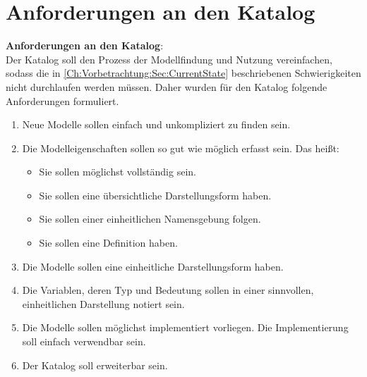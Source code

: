 \section{Anforderungen an den Katalog} %
\label{Ch:Vorbetrachtung:Sec:Anforderungen}
\textbf{Anforderungen an den Katalog}:\\ %
Der Katalog soll den Prozess der Modellfindung und Nutzung vereinfachen, sodass die in \autoref{Ch:Vorbetrachtung:Sec:CurrentState} beschriebenen Schwierigkeiten nicht durchlaufen werden müssen. Daher wurden für den Katalog folgende Anforderungen formuliert.
\begin{enumerate}[label=\textbf{Anforderung A.\arabic*}:, ref=\textbf{A.\arabic*}, wide=0pt, leftmargin=*]
	\item \label{A.Findbarkeit}Neue Modelle sollen einfach und unkompliziert zu finden sein.
	\item \label{A.Modelleigenschaften}Die Modelleigenschaften sollen so gut wie möglich erfasst sein. Das heißt:
	\begin{itemize}[label=$\bullet$]
		\item Sie sollen möglichst vollständig sein.
		\item Sie sollen eine übersichtliche Darstellungsform haben.
		\item Sie sollen einer einheitlichen Namensgebung folgen.
		\item Sie sollen eine Definition haben.
	\end{itemize}
	\item \label{A.Darstellung_Gleichungen}Die Modelle sollen eine einheitliche Darstellungsform haben.
	\item \label{A.Darstellung_Variablen}Die Variablen, deren Typ und Bedeutung sollen in einer sinnvollen, einheitlichen Darstellung notiert sein.
	\item \label{A.Implementierung}Die Modelle sollen möglichst implementiert vorliegen. Die Implementierung soll einfach verwendbar sein.
	\item \label{A.Erweiterbarkeit}Der Katalog soll erweiterbar sein. %
\end{enumerate}

